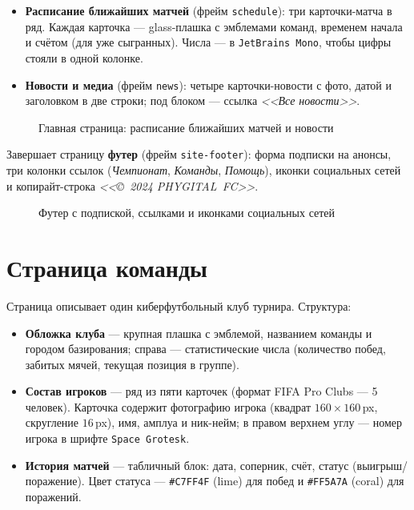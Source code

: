 \begin{itemize}
  \item \textbf{Расписание ближайших матчей} (фрейм
        \texttt{schedule}): три карточки-матча в ряд. Каждая
        карточка --- glass-плашка с эмблемами команд, временем
        начала и счётом (для уже сыгранных). Числа --- в
        \texttt{JetBrains~Mono}, чтобы цифры стояли в одной колонке.
  \item \textbf{Новости и медиа} (фрейм \texttt{news}): четыре
        карточки-новости с фото, датой и заголовком в две строки;
        под блоком --- ссылка \textit{<<Все новости>>}.
\end{itemize}

\begin{figure}[h]
  \centering
  \caption{Главная страница: расписание ближайших матчей и новости}
  \label{fig:home_schedule}
\end{figure}

Завершает страницу \textbf{футер} (фрейм \texttt{site-footer}):
форма подписки на анонсы, три колонки ссылок (\textit{Чемпионат},
\textit{Команды}, \textit{Помощь}), иконки социальных сетей и
копирайт-строка \textit{<<\copyright~2024 PHYGITAL~FC>>}.

\begin{figure}[h]
  \centering
  \caption{Футер с подпиской, ссылками и иконками социальных сетей}
  \label{fig:home_footer}
\end{figure}

\section{Страница команды}

Страница описывает один киберфутбольный клуб турнира. Структура:

\begin{itemize}
  \item \textbf{Обложка клуба} --- крупная плашка с эмблемой,
        названием команды и городом базирования; справа ---
        статистические числа (количество побед, забитых мячей,
        текущая позиция в группе).
  \item \textbf{Состав игроков} --- ряд из пяти карточек (формат
        FIFA Pro Clubs --- 5 человек). Карточка содержит фотографию
        игрока (квадрат \(160\times160\,\)px, скругление \(16\,\)px),
        имя, амплуа и ник-нейм; в правом верхнем углу --- номер
        игрока в шрифте \texttt{Space~Grotesk}.
  \item \textbf{История матчей} --- табличный блок: дата, соперник,
        счёт, статус (выигрыш/поражение). Цвет статуса ---
        \texttt{\#C7FF4F} (lime) для побед и \texttt{\#FF5A7A}
        (coral) для поражений.
\end{itemize}

